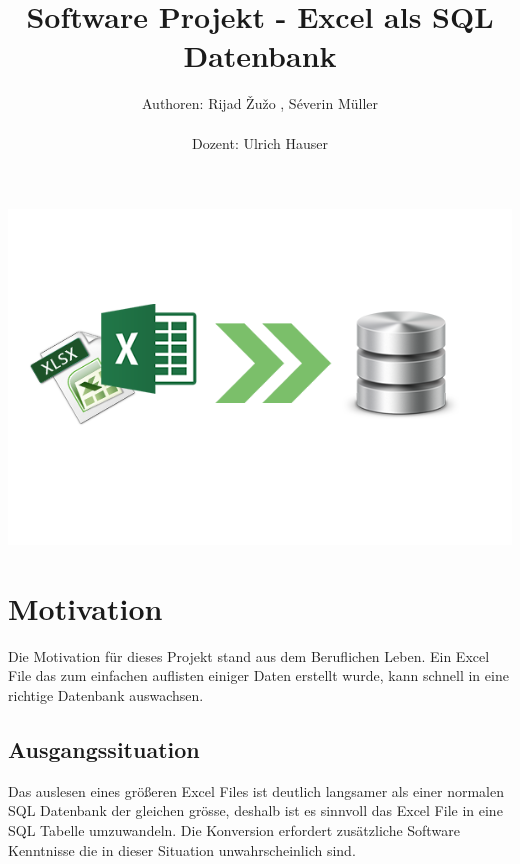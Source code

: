 \documentclass{article}
\begin{document}

\title{Software Projekt - Excel als SQL Datenbank}
\author{Authoren: Rijad \v{Z}u\v{z}o , Séverin Müller \\ \\ Dozent: Ulrich Hauser}

\maketitle

\vspace{80mm}
\begin{center}
		\includegraphics{SoftwareLogo}
\end{center}

\newpage
\tableofcontents
\newpage


\section{Motivation}
Die Motivation für dieses Projekt stand aus dem Beruflichen Leben. Ein Excel File das zum einfachen auflisten einiger Daten erstellt wurde, kann schnell in eine richtige Datenbank auswachsen.

\subsection{Ausgangssituation}
Das auslesen eines größeren Excel Files ist deutlich langsamer als einer normalen SQL Datenbank der gleichen grösse, deshalb ist es sinnvoll das Excel File in eine SQL Tabelle umzuwandeln. \newline 
Die Konversion erfordert zusätzliche Software Kenntnisse die in dieser Situation unwahrscheinlich sind. \\
\end{document}
